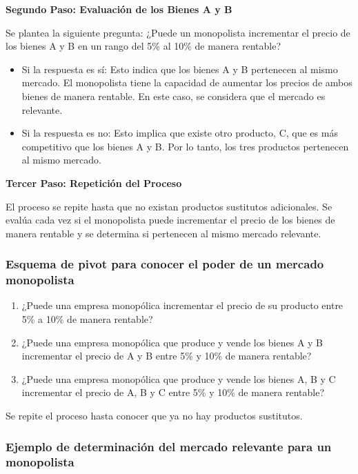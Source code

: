 \documentclass[
  doc,
  floatsintext,
  longtable,
  a4paper,
  nolmodern,
  notxfonts,
  notimes,
  12pt,
  colorlinks=true,linkcolor=blue,citecolor=blue,urlcolor=blue]{apa7}
\begin{document}
\textbf{Segundo Paso: Evaluación de los Bienes A y B}

Se plantea la siguiente pregunta: ¿Puede un monopolista incrementar el
precio de los bienes A y B en un rango del 5\% al 10\% de manera
rentable?

\begin{itemize}
\item
  Si la respuesta es sí: Esto indica que los bienes A y B pertenecen al
  mismo mercado. El monopolista tiene la capacidad de aumentar los
  precios de ambos bienes de manera rentable. En este caso, se considera
  que el mercado es relevante.
\item
  Si la respuesta es no: Esto implica que existe otro producto, C, que
  es más competitivo que los bienes A y B. Por lo tanto, los tres
  productos pertenecen al mismo mercado.
\end{itemize}

\textbf{Tercer Paso: Repetición del Proceso}

El proceso se repite hasta que no existan productos sustitutos
adicionales. Se evalúa cada vez si el monopolista puede incrementar el
precio de los bienes de manera rentable y se determina si pertenecen al
mismo mercado relevante.

\subsubsection{Esquema de pivot para conocer el poder de un mercado
monopolista}\label{esquema-de-pivot-para-conocer-el-poder-de-un-mercado-monopolista}

\begin{enumerate}
\def\labelenumi{\arabic{enumi}.}
\item
  ¿Puede una empresa monopólica incrementar el precio de su producto
  entre 5\% a 10\% de manera rentable?
\item
  ¿Puede una empresa monopólica que produce y vende los bienes A y B
  incrementar el precio de A y B entre 5\% y 10\% de manera rentable?
\item
  ¿Puede una empresa monopólica que produce y vende los bienes A, B y C
  incrementar el precio de A, B y C entre 5\% y 10\% de manera rentable?
\end{enumerate}

Se repite el proceso hasta conocer que ya no hay productos sustitutos.

\subsubsection{Ejemplo de determinación del mercado relevante para un
monopolista}\label{ejemplo-de-determinaciuxf3n-del-mercado-relevante-para-un-monopolista}
\end{document}
